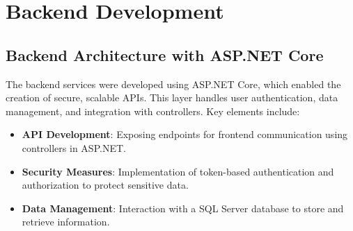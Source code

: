
\section{Backend Development}

\subsection{Backend Architecture with ASP.NET Core}
The backend services were developed using ASP.NET Core, which enabled the creation of secure, scalable APIs. This layer handles user authentication, data management, and integration with controllers. Key elements include:
\begin{itemize}
    \item \textbf{API Development}: Exposing endpoints for frontend communication using controllers in ASP.NET.
    \item \textbf{Security Measures}: Implementation of token-based authentication and authorization to protect sensitive data.
    \item \textbf{Data Management}: Interaction with a SQL Server database to store and retrieve information.
\end{itemize}

